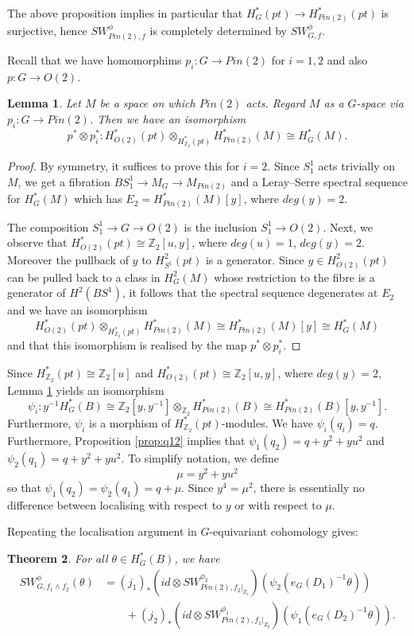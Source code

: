 \documentclass{amsart}
\newtheorem{theorem}{Theorem}[section]
\newtheorem{lemma}[theorem]{Lemma}
\theoremstyle{definition}
\theoremstyle{remark}
\numberwithin{equation}{section}
\begin{document}
The above proposition implies in particular that $H^*_G(pt) \to H^*_{Pin(2)}(pt)$ is surjective, hence $SW_{Pin(2),f}^{\phi}$ is completely determined by $SW_{G,f}^{\phi}$.

Recall that we have homomorphims $p_i : G \to Pin(2)$ for $i=1,2$ and also $p : G \to O(2)$.

\begin{lemma}\label{lem:tensor}
Let $M$ be a space on which $Pin(2)$ acts. Regard $M$ as a $G$-space via $p_i : G \to Pin(2)$. Then we have an isomorphism
\[
p^* \otimes p_i^* : H^*_{O(2)}(pt) \otimes_{H^*_{\mathbb{Z}_2}(pt)} H^*_{Pin(2)}(M) \cong H^*_G(M).
\]
\end{lemma}
\begin{proof}
By symmetry, it suffices to prove this for $i=2$. Since $S_1^1$ acts trivially on $M$, we get a fibration $BS^1_1 \to M_G \to M_{Pin(2)}$ and a Leray--Serre spectral sequence for $H^*_G(M)$ which has $E_2 = H_{Pin(2)}^*(M)[y]$, where $deg(y) = 2$.

The composition $S^1_1 \to G \to O(2)$ is the inclusion $S^1_1 \to O(2)$. Next, we observe that $H^*_{O(2)}(pt) \cong \mathbb{Z}_2[u,y]$, where $deg(u) = 1$, $deg(y)=2$. Moreover the pullback of $y$ to $H^2_{S^1}(pt)$ is a generator. Since $y \in H^2_{O(2)}(pt)$ can be pulled back to a class in $H^2_G(M)$ whose restriction to the fibre is a generator of $H^2( BS^1)$, it follows that the spectral sequence degenerates at $E_2$ and we have an isomorphism
\[
H^*_{O(2)}(pt) \otimes_{H^*_{\mathbb{Z}_2}(pt)} H^*_{Pin(2)}(M) \cong H^*_{Pin(2)}(M)[y] \cong H^*_G(M)
\]
and that this isomorphism is realised by the map $p^* \otimes p_i^*$.
\end{proof}

Since $H^*_{\mathbb{Z}_2}(pt) \cong \mathbb{Z}_2[u]$ and $H^*_{O(2)}(pt) \cong \mathbb{Z}_2[u,y]$, where $deg(y) = 2$, Lemma \ref{lem:tensor} yields an isomorphism
\[
\psi_i : y^{-1}H^*_G(B) \cong \mathbb{Z}_2[y,y^{-1}] \otimes_{\mathbb{Z}_2} H^*_{Pin(2)}(B) \cong H^*_{Pin(2)}(B)[y,y^{-1}].
\]
Furthermore, $\psi_i$ is a morphism of $H^*_{\mathbb{Z}_2}(pt)$-modules. We have $\psi_i( q_i ) = q$. Furthermore, Proposition \ref{prop:q12} implies that $\psi_1(q_2) = q + y^2 + yu^2$ and $\psi_2(q_1) = q + y^2 + yu^2$. To simplify notation, we define
\[
\mu = y^2 + yu^2
\]
so that $\psi_1(q_2) = \psi_2(q_1) = q+\mu$. Since $y^4 = \mu^2$, there is essentially no difference between localising with respect to $y$ or with respect to $\mu$.

Repeating the localisation argument in $G$-equivariant cohomology gives:
\begin{theorem}\label{thm:product2}
For all $\theta \in H^*_{G}(B)$, we have
\begin{align*}
SW^{\phi}_{G , f_1 \wedge f_2}(\theta) &= (j_1)_*\left( id \otimes SW^{\phi_2}_{Pin(2) , f_2|_{Z_1}}\right)( \psi_2(e_{G}(D_1)^{-1}\theta) ) \\
& \quad \quad + (j_2)_* \left(id \otimes SW^{\phi_1}_{Pin(2) , f_1|_{Z_2}}\right)( \psi_1( e_{G}(D_2)^{-1} \theta) ).
\end{align*}
\end{theorem}
\end{document}
